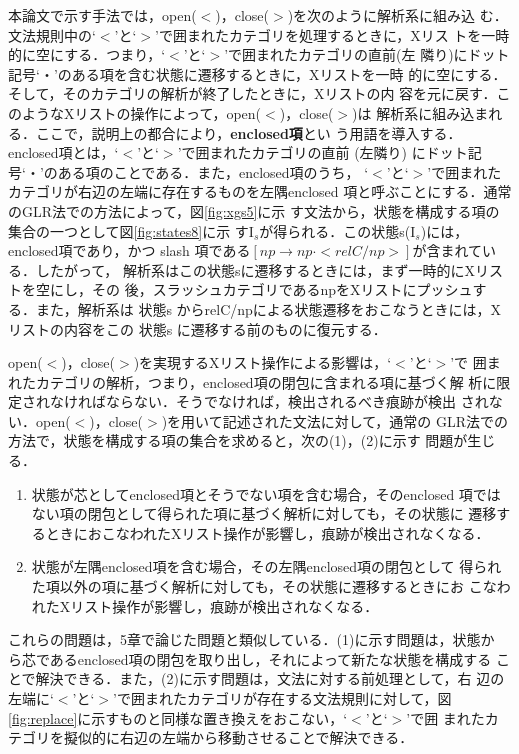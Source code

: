 本論文で示す手法では，open($<$)，close($>$)を次のように解析系に組み込
む．文法規則中の`$<$'と`$>$'で囲まれたカテゴリを処理するときに，Xリス
トを一時的に空にする．つまり，`$<$'と`$>$'で囲まれたカテゴリの直前(左
隣り)にドット記号`・'のある項を含む状態に遷移するときに，Xリストを一時
的に空にする．そして，そのカテゴリの解析が終了したときに，Xリストの内
容を元に戻す．このようなXリストの操作によって，open($<$)，close($>$)は
解析系に組み込まれる．ここで，説明上の都合により，{\bf enclosed項}とい
う用語を導入する．enclosed項とは，`$<$'と`$>$'で囲まれたカテゴリの直前
(左隣り) にドット記号`・'のある項のことである．また，enclosed項のうち，
`$<$'と`$>$'で囲まれたカテゴリが右辺の左端に存在するものを左隅enclosed
項と呼ぶことにする．通常のGLR法での方法によって，図\ref{fig:xgs5}に示
す文法から，状態を構成する項の集合の一つとして図\ref{fig:states8}に示
すI$_{s}$が得られる．この状態s(I$_{s}$)には，enclosed項であり，かつ
slash 項である$[np \to np \cdot <relC/np>]$が含まれている．したがって，
解析系はこの状態sに遷移するときには，まず一時的にXリストを空にし，その
後，スラッシュカテゴリであるnpをXリストにプッシュする．また，解析系は
状態s からrelC/npによる状態遷移をおこなうときには，Xリストの内容をこの
状態s に遷移する前のものに復元する．

open($<$)，close($>$)を実現するXリスト操作による影響は，`$<$'と`$>$'で
囲まれたカテゴリの解析，つまり，enclosed項の閉包に含まれる項に基づく解
析に限定されなければならない．そうでなければ，検出されるべき痕跡が検出
されない．open($<$)，close($>$)を用いて記述された文法に対して，通常の
GLR法での方法で，状態を構成する項の集合を求めると，次の(1)，(2)に示す
問題が生じる．

\begin{enumerate}
\item 状態が芯としてenclosed項とそうでない項を含む場合，そのenclosed
  項ではない項の閉包として得られた項に基づく解析に対しても，その状態に
  遷移するときにおこなわれたXリスト操作が影響し，痕跡が検出されなくなる．
\item 状態が左隅enclosed項を含む場合，その左隅enclosed項の閉包として
  得られた項以外の項に基づく解析に対しても，その状態に遷移するときにお
  こなわれたXリスト操作が影響し，痕跡が検出されなくなる．
\end{enumerate}

これらの問題は，5章で論じた問題と類似している．(1)に示す問題は，状態か
ら芯であるenclosed項の閉包を取り出し，それによって新たな状態を構成する
ことで解決できる．また，(2)に示す問題は，文法に対する前処理として，右
辺の左端に`$<$'と`$>$'で囲まれたカテゴリが存在する文法規則に対して，図
\ref{fig:replace}に示すものと同様な置き換えをおこない，`$<$'と`$>$'で囲
まれたカテゴリを擬似的に右辺の左端から移動させることで解決できる．

